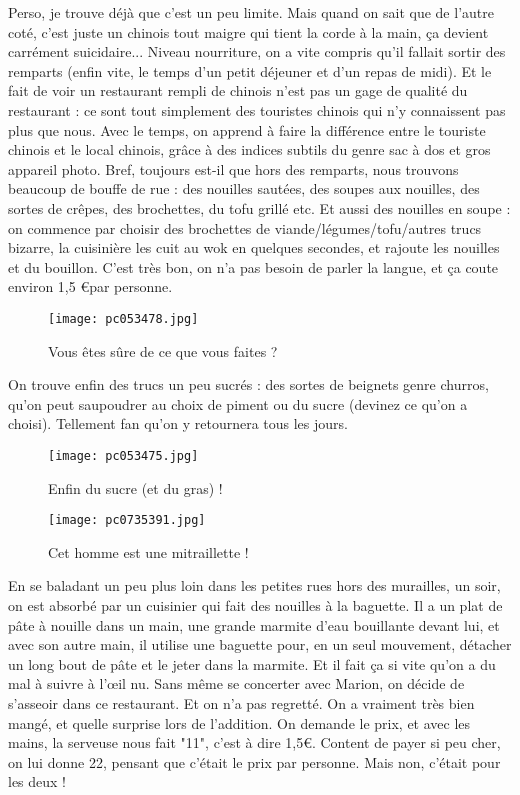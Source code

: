 \documentclass{book}
\begin{document}
Perso, je trouve déjà que c'est un peu limite. Mais quand on sait que de l'autre coté, c'est juste un chinois tout maigre qui tient la corde à la main, ça devient carrément suicidaire...
Niveau nourriture, on a vite compris qu'il fallait sortir des remparts (enfin vite, le temps d'un petit déjeuner et d'un repas de midi). Et le fait de voir un restaurant rempli de chinois n'est pas un gage de qualité du restaurant : ce sont tout simplement des touristes chinois qui n'y connaissent pas plus que nous. Avec le temps, on apprend à faire la différence entre le touriste chinois et le local chinois, grâce à des indices subtils du genre sac à dos et gros appareil photo. Bref, toujours est-il que hors des remparts, nous trouvons beaucoup de bouffe de rue : des nouilles sautées, des soupes aux nouilles, des sortes de crêpes, des brochettes, du tofu grillé etc. Et aussi des nouilles en soupe : on commence par choisir des brochettes de viande/légumes/tofu/autres trucs bizarre, la cuisinière les cuit au wok en quelques secondes, et rajoute les nouilles et du bouillon. C'est très bon, on n'a pas besoin de parler la langue, et ça coute environ 1,5 \euro par personne.


\begin{figure}[H]
\centering
\texttt{[image: pc053478.jpg]}
\caption*{Vous êtes sûre de ce que vous faites ?}
\end{figure}

On trouve enfin des trucs un peu sucrés : des sortes de beignets genre churros, qu'on peut saupoudrer au choix de piment ou du sucre (devinez ce qu'on a choisi). Tellement fan qu'on y retournera tous les jours.


\begin{figure}[H]
\centering
\texttt{[image: pc053475.jpg]}
\caption*{Enfin du sucre (et du gras) !}
\end{figure}


\begin{wrapfigure}{l}{0.55\textwidth}
\centering
\texttt{[image: pc0735391.jpg]}
\caption*{Cet homme est une mitraillette !}
\end{wrapfigure}

En se baladant un peu plus loin dans les petites rues hors des murailles, un soir, on est absorbé par un cuisinier qui fait des nouilles à la baguette. Il a un plat de pâte à nouille dans un main, une grande marmite d'eau bouillante devant lui, et avec son autre main, il utilise une baguette pour, en un seul mouvement, détacher un long bout de pâte et le jeter dans la marmite. Et il fait ça si vite qu'on a du mal à suivre à l’œil nu. Sans même se concerter avec Marion, on décide de s'asseoir dans ce restaurant. Et on n'a pas regretté. On a vraiment très bien mangé, et quelle surprise lors de l'addition. On demande le prix, et avec les mains, la serveuse nous fait "11", c'est à dire 1,5\euro. Content de payer si peu cher, on lui donne 22, pensant que c'était le prix par personne. Mais non, c'était pour les deux !
\end{document}
